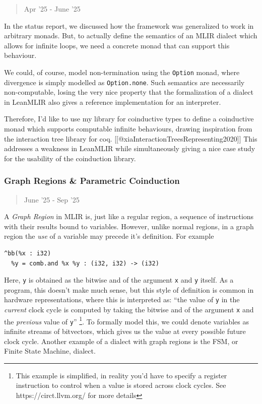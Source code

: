 \documentclass[a4paper]{article}
\begin{document}
\begin{quote}
Apr '25 - June '25
\end{quote}

In the status report, we discussed how the framework was generalized to
work in arbitrary monads. But, to actually define the semantics of an
MLIR dialect which allows for infinite loops, we need a concrete monad
that can support this behaviour.

We could, of course, model non-termination using the \texttt{Option}
monad, where divergence is simply modelled as \texttt{Option.none}. Such
semantics are necessarily non-computable, losing the very nice property
that the formalization of a dialect in LeanMLIR also gives a reference
implementation for an interpreter.

Therefore, I'd like to use my library for coinductive types to define a
coinductive monad which supports computable infinite behaviours, drawing
inspiration from the interaction tree library for coq.
{[}{[}@xiaInteractionTreesRepresenting2020{]}{]} This addresses a
weakness in LeanMLIR while simultaneously giving a nice case study for
the usability of the coinduction library.

\hypertarget{graph-regions-parametric-coinduction}{%
\subsubsection{Graph Regions \& Parametric
Coinduction}\label{graph-regions-parametric-coinduction}}

\begin{quote}
June '25 - Sep '25
\end{quote}

A \emph{Graph Region} in MLIR is, just like a regular region, a sequence
of instructions with their results bound to variables. However, unlike
normal regions, in a graph region the \emph{use} of a variable may
precede it's definition. For example

\begin{verbatim}
^bb(%x : i32)
  %y = comb.and %x %y : (i32, i32) -> (i32)
\end{verbatim}

Here, \texttt{y} is obtained as the bitwise and of the argument
\texttt{x} and \texttt{y} itself. As a program, this doesn't make much
sense, but this style of definition is common in hardware
representations, where this is interpreted as: ``the value of \texttt{y}
in the \emph{current} clock cycle is computed by taking the bitwise and
of the argument \texttt{x} and the \emph{previous} value of \texttt{y}''
\footnote{This example is simplified, in reality you'd have to specify a
  register instruction to control when a value is stored across clock
  cycles. See https://circt.llvm.org/ for more details}. To formally
model this, we could denote variables as infinite streams of bitvectors,
which gives us the value at every possible future clock cycle. Another
example of a dialect with graph regions is the FSM, or Finite State
Machine, dialect.
\end{document}
